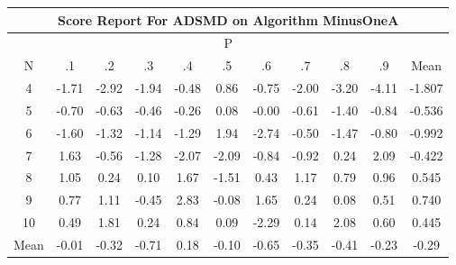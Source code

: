 \documentclass[11pt,a4paper]{report}
\begin{document}
\begin{longtable}{ | c || c | c | c | c | c | c | c | c | c || c |}
\hline
\multicolumn{11}{|c|}{ Score Report For ADSMD on Algorithm MinusOneA} \\
\hline
\multicolumn{11}{|c|}{ P } \\
\hline
N & .1 & .2 & .3 & .4 & .5 & .6 & .7 & .8 & .9 & Mean\\
 \hline
 \hline
 \endhead
  4 &  \cellcolor[HTML]{FFD7D7} -1.71 &  \cellcolor[HTML]{FFB7B7} -2.92 &  \cellcolor[HTML]{FFCFCF} -1.94 &  \cellcolor[HTML]{FFEFEF} -0.48 &  \cellcolor[HTML]{E7E7FF} 0.86 &  \cellcolor[HTML]{FFEFEF} -0.75 &  \cellcolor[HTML]{FFCFCF} -2.00 &  \cellcolor[HTML]{FFAFAF} -3.20 &  \cellcolor[HTML]{FF9797} -4.11 & -1.807 \\
  5 &  \cellcolor[HTML]{FFEFEF} -0.70 &  \cellcolor[HTML]{FFEFEF} -0.63 &  \cellcolor[HTML]{FFF7F7} -0.46 &  \cellcolor[HTML]{FFF7F7} -0.26 &  \cellcolor[HTML]{FFFFFF} 0.08 &  \cellcolor[HTML]{FFFFFF} -0.00 &  \cellcolor[HTML]{FFEFEF} -0.61 &  \cellcolor[HTML]{FFDFDF} -1.40 &  \cellcolor[HTML]{FFE7E7} -0.84 & -0.536 \\
  6 &  \cellcolor[HTML]{FFD7D7} -1.60 &  \cellcolor[HTML]{FFDFDF} -1.32 &  \cellcolor[HTML]{FFDFDF} -1.14 &  \cellcolor[HTML]{FFDFDF} -1.29 &  \cellcolor[HTML]{CFCFFF} 1.94 &  \cellcolor[HTML]{FFB7B7} -2.74 &  \cellcolor[HTML]{FFEFEF} -0.50 &  \cellcolor[HTML]{FFD7D7} -1.47 &  \cellcolor[HTML]{FFE7E7} -0.80 & -0.992 \\
  7 &  \cellcolor[HTML]{D7D7FF} 1.63 &  \cellcolor[HTML]{FFEFEF} -0.56 &  \cellcolor[HTML]{FFDFDF} -1.28 &  \cellcolor[HTML]{FFC7C7} -2.07 &  \cellcolor[HTML]{FFC7C7} -2.09 &  \cellcolor[HTML]{FFE7E7} -0.84 &  \cellcolor[HTML]{FFE7E7} -0.92 &  \cellcolor[HTML]{F7F7FF} 0.24 &  \cellcolor[HTML]{C7C7FF} 2.09 & -0.422 \\
  8 &  \cellcolor[HTML]{E7E7FF} 1.05 &  \cellcolor[HTML]{F7F7FF} 0.24 &  \cellcolor[HTML]{FFFFFF} 0.10 &  \cellcolor[HTML]{D7D7FF} 1.67 &  \cellcolor[HTML]{FFD7D7} -1.51 &  \cellcolor[HTML]{F7F7FF} 0.43 &  \cellcolor[HTML]{DFDFFF} 1.17 &  \cellcolor[HTML]{EFEFFF} 0.79 &  \cellcolor[HTML]{E7E7FF} 0.96 & 0.545 \\
  9 &  \cellcolor[HTML]{EFEFFF} 0.77 &  \cellcolor[HTML]{DFDFFF} 1.11 &  \cellcolor[HTML]{FFF7F7} -0.45 &  \cellcolor[HTML]{B7B7FF} 2.83 &  \cellcolor[HTML]{FFFFFF} -0.08 &  \cellcolor[HTML]{D7D7FF} 1.65 &  \cellcolor[HTML]{F7F7FF} 0.24 &  \cellcolor[HTML]{FFFFFF} 0.08 &  \cellcolor[HTML]{EFEFFF} 0.51 & 0.740 \\
  10 &  \cellcolor[HTML]{EFEFFF} 0.49 &  \cellcolor[HTML]{CFCFFF} 1.81 &  \cellcolor[HTML]{F7F7FF} 0.24 &  \cellcolor[HTML]{E7E7FF} 0.84 &  \cellcolor[HTML]{FFFFFF} 0.09 &  \cellcolor[HTML]{FFC7C7} -2.29 &  \cellcolor[HTML]{FFFFFF} 0.14 &  \cellcolor[HTML]{C7C7FF} 2.08 &  \cellcolor[HTML]{EFEFFF} 0.60 & 0.445 \\
 \hline
 \hline
Mean &  \cellcolor[HTML]{FFFFFF} -0.01 &  \cellcolor[HTML]{FFF7F7} -0.32 &  \cellcolor[HTML]{FFEFEF} -0.71 &  \cellcolor[HTML]{F7F7FF} 0.18 &  \cellcolor[HTML]{FFFFFF} -0.10 &  \cellcolor[HTML]{FFEFEF} -0.65 &  \cellcolor[HTML]{FFF7F7} -0.35 &  \cellcolor[HTML]{FFF7F7} -0.41 &  \cellcolor[HTML]{FFF7F7} -0.23 &  \cellcolor[HTML]{FFF7F7} -0.29
\end{longtable}
\end{document}
